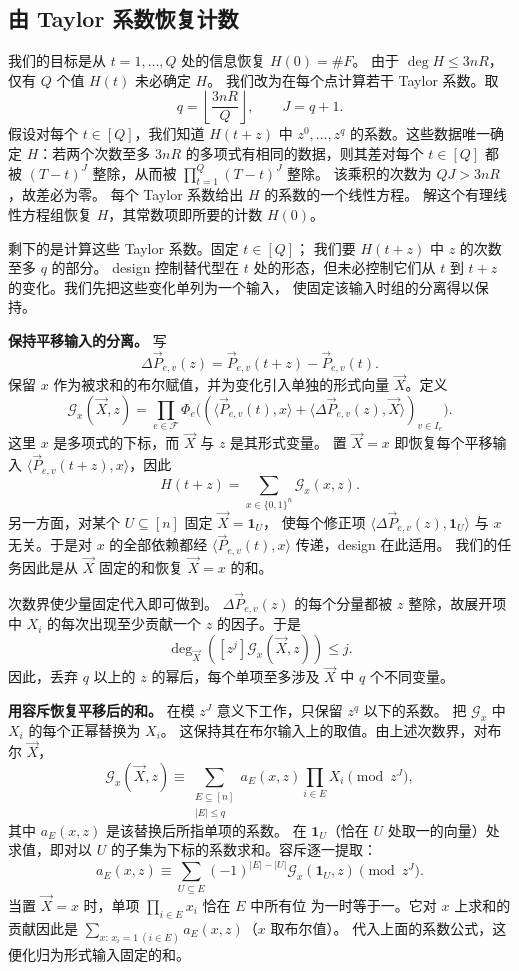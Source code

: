 \subsection{由 Taylor 系数恢复计数}
\label{subsec:preview-interpolation}
我们的目标是从 $t=1,\ldots,Q$ 处的信息恢复 $H(0)=\#F$。
由于 $\deg H\le3nR$，仅有 $Q$ 个值 $H(t)$ 未必确定 $H$。
我们改为在每个点计算若干 Taylor 系数。取
\[
 q=\left\lfloor\frac{3nR}{Q}\right\rfloor,\qquad J=q+1.
\]
假设对每个 $t\in[Q]$，我们知道 $H(t+z)$ 中 $z^0,\ldots,z^q$
的系数。这些数据唯一确定 $H$：若两个次数至多 $3nR$
的多项式有相同的数据，则其差对每个 $t\in[Q]$ 都被
$(T-t)^J$ 整除，从而被 $\prod_{t=1}^Q(T-t)^J$ 整除。
该乘积的次数为 $QJ>3nR$，故差必为零。
每个 Taylor 系数给出 $H$ 的系数的一个线性方程。
解这个有理线性方程组恢复 $H$，其常数项即所要的计数 $H(0)$。

剩下的是计算这些 Taylor 系数。固定 $t\in[Q]$；
我们要 $H(t+z)$ 中 $z$ 的次数至多 $q$ 的部分。
design 控制替代型在 $t$ 处的形态，但未必控制它们从 $t$
到 $t+z$ 的变化。我们先把这些变化单列为一个输入，
使固定该输入时组的分离得以保持。

\smallskip\noindent
\textbf{保持平移输入的分离。}
写
\[
 \Delta\vec P_{e,v}(z)=\vec P_{e,v}(t+z)-\vec P_{e,v}(t).
\]
保留 $x$ 作为被求和的布尔赋值，并为变化引入单独的形式向量
$\vec X$。定义
\begin{equation}\label{eq:outline-taylor-product}
 \mathcal G_x(\vec X,z)=
 \prod_{e\in\mathcal F}\Phi_e\bigl(
       (\langle\vec P_{e,v}(t),x\rangle+
        \langle\Delta\vec P_{e,v}(z),\vec X\rangle)_{v\in I_e}\bigr).
\end{equation}
这里 $x$ 是多项式的下标，而 $\vec X$ 与 $z$ 是其形式变量。
置 $\vec X=x$ 即恢复每个平移输入
$\langle\vec P_{e,v}(t+z),x\rangle$，因此
\[
 H(t+z)=\sum_{x\in\{0,1\}^n}\mathcal G_x(x,z).
\]
另一方面，对某个 $U\subseteq[n]$ 固定 $\vec X=\mathbf1_U$，
使每个修正项 $\langle\Delta\vec P_{e,v}(z),\mathbf1_U\rangle$
与 $x$ 无关。于是对 $x$ 的全部依赖都经
$\langle\vec P_{e,v}(t),x\rangle$ 传递，design 在此适用。
我们的任务因此是从 $\vec X$ 固定的和恢复 $\vec X=x$ 的和。

次数界使少量固定代入即可做到。
$\Delta\vec P_{e,v}(z)$ 的每个分量都被 $z$ 整除，故展开项中
$X_i$ 的每次出现至少贡献一个 $z$ 的因子。于是
\[
 \deg_{\vec X}([z^j]\mathcal G_x(\vec X,z))\le j.
\]
因此，丢弃 $q$ 以上的 $z$ 的幂后，每个单项至多涉及 $\vec X$
中 $q$ 个不同变量。

\smallskip\noindent
\textbf{用容斥恢复平移后的和。}
在模 $z^J$ 意义下工作，只保留 $z^q$ 以下的系数。
把 $\mathcal G_x$ 中 $X_i$ 的每个正幂替换为 $X_i$。
这保持其在布尔输入上的取值。由上述次数界，对布尔 $\vec X$，
\[
 \mathcal G_x(\vec X,z)\equiv
 \sum_{\substack{E\subseteq[n]\\|E|\le q}}
       a_E(x,z)\prod_{i\in E}X_i\pmod{z^J},
\]
其中 $a_E(x,z)$ 是该替换后所指单项的系数。
在 $\mathbf1_U$（恰在 $U$ 处取一的向量）处求值，即对以 $U$
的子集为下标的系数求和。容斥逐一提取：
\[
 a_E(x,z)\equiv
 \sum_{U\subseteq E}(-1)^{|E|-|U|}
                 \mathcal G_x(\mathbf1_U,z)\pmod{z^J}.
\]
当置 $\vec X=x$ 时，单项 $\prod_{i\in E}x_i$ 恰在 $E$ 中所有位
为一时等于一。它对 $x$ 上求和的贡献因此是
$\sum_{x:\,x_i=1\ (i\in E)}a_E(x,z)$（$x$ 取布尔值）。
代入上面的系数公式，这便化归为形式输入固定的和。

